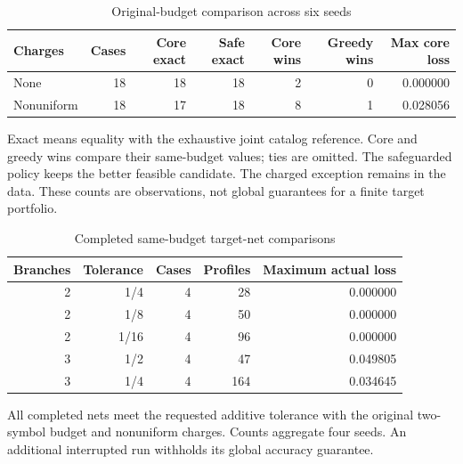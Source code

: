 \begin{table}[p]\centering\small
\caption{Original-budget comparison across six seeds}\label{tab:r45-comparison}
\begin{tabular}{lrrrrrr}\toprule
Charges & Cases & Core exact & Safe exact & Core wins & Greedy wins & Max core loss \\
\midrule
None & 18 & 18 & 18 & 2 & 0 & 0.000000 \\
Nonuniform & 18 & 17 & 18 & 8 & 1 & 0.028056 \\
\bottomrule\end{tabular}
\par\smallskip\begin{minipage}{.98\textwidth}\footnotesize Exact means equality with the exhaustive joint catalog reference. Core and greedy wins compare their same-budget values; ties are omitted. The safeguarded policy keeps the better feasible candidate. The charged exception remains in the data. These counts are observations, not global guarantees for a finite target portfolio.\end{minipage}
\end{table}
\begin{table}[p]\centering\small
\caption{Completed same-budget target-net comparisons}\label{tab:r45-net}
\begin{tabular}{rrrrr}\toprule
Branches & Tolerance & Cases & Profiles & Maximum actual loss \\
\midrule
2 & 1/4 & 4 & 28 & 0.000000 \\
2 & 1/8 & 4 & 50 & 0.000000 \\
2 & 1/16 & 4 & 96 & 0.000000 \\
3 & 1/2 & 4 & 47 & 0.049805 \\
3 & 1/4 & 4 & 164 & 0.034645 \\
\bottomrule\end{tabular}
\par\smallskip\begin{minipage}{.98\textwidth}\footnotesize All completed nets meet the requested additive tolerance with the original two-symbol budget and nonuniform charges. Counts aggregate four seeds. An additional interrupted run withholds its global accuracy guarantee.\end{minipage}
\end{table}
